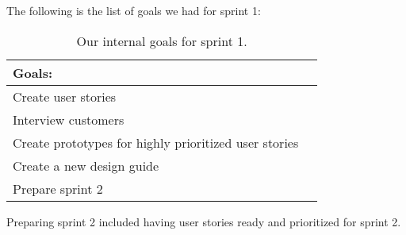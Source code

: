 \noindent
The following is the list of goals we had for sprint 1:
\begin{table}[H]
    \centering
    \begin{tabular}{|l|l|}
    \hline
    Goals:                                \\ \hline
    Create user stories                   \\ \hline
    Interview customers                    \\ \hline
    Create prototypes for highly prioritized user stories \\ \hline
    Create a new design guide                \\ \hline
    Prepare sprint 2                       \\ \hline
    \end{tabular}
    \caption{Our internal goals for sprint 1.}
    \label{PO-goal-sprint-1}
\end{table}
\noindent
Preparing sprint 2 included having user stories ready and prioritized for sprint 2.
